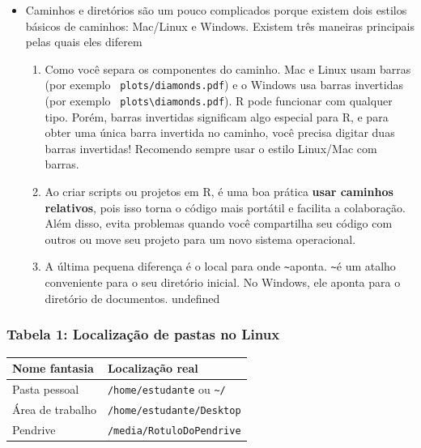 \documentclass[
  letterpaper,
  DIV=11,
  numbers=noendperiod]{scrartcl}
\begin{document}
\begin{itemize}
\item
  Caminhos e diretórios são um pouco complicados porque existem dois
  estilos básicos de caminhos: Mac/Linux e Windows. Existem três
  maneiras principais pelas quais eles diferem

  \begin{enumerate}
  \def\labelenumi{\arabic{enumi}.}
  \item
    Como você separa os componentes do caminho. Mac e Linux usam barras
    (por exemplo~ \texttt{plots/diamonds.pdf}) e o Windows usa barras
    invertidas (por exemplo~
    \texttt{plots\textbackslash{}diamonds.pdf}). R pode funcionar com
    qualquer tipo. Porém, barras invertidas significam algo especial
    para R, e para obter uma única barra invertida no caminho, você
    precisa digitar duas barras invertidas! Recomendo sempre usar o
    estilo Linux/Mac com barras.
  \item
    Ao criar scripts ou projetos em R, é uma boa prática \textbf{usar
    caminhos relativos}, pois isso torna o código mais portátil e
    facilita a colaboração. Além disso, evita problemas quando você
    compartilha seu código com outros ou move seu projeto para um novo
    sistema operacional.
  \item
    A última pequena diferença é o local para onde
    \texttt{\textasciitilde{}}aponta. \texttt{\textasciitilde{}}é um
    atalho conveniente para o seu diretório inicial. No Windows, ele
    aponta para o diretório de documentos. undefined
  \end{enumerate}
\end{itemize}

\subsubsection{Tabela 1: Localização de pastas no
Linux}\label{tabela-1-localizauxe7uxe3o-de-pastas-no-linux}

\begin{longtable}[]{@{}ll@{}}
\toprule\noalign{}
Nome fantasia & Localização real \\
\midrule\noalign{}
\endhead
\bottomrule\noalign{}
\endlastfoot
Pasta pessoal & \texttt{/home/estudante} ou
\texttt{\textasciitilde{}/} \\
Área de trabalho & \texttt{/home/estudante/Desktop} \\
Pendrive & \texttt{/media/RotuloDoPendrive} \\
\end{longtable}
\end{document}
